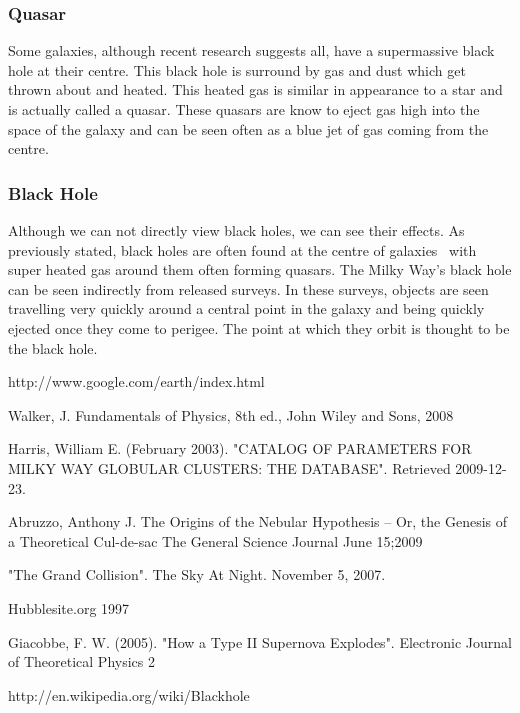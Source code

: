 \documentclass{article}
\begin{document}
\subsubsection{Quasar}
Some galaxies, although recent research suggests all, have a supermassive black hole at their 
centre. This black hole is surround by gas and dust which get thrown about and heated. This
heated gas is similar in appearance to a star and is actually called a quasar. These quasars
are know to eject gas high into the space of the galaxy and can be seen often as a blue jet
of gas coming from the centre.

\subsubsection{Black Hole}
Although we can not directly view black holes, we can see their effects. As previously stated,
black holes are often found at the centre of galaxies~\cite{Wik:2013} with super heated gas around them often
forming quasars. The Milky Way's black hole can be seen indirectly from released surveys. In
these surveys, objects are seen travelling very quickly around a central point in the galaxy and
being quickly ejected once they come to perigee. The point at which they orbit is thought
to be the black hole.


\begin{thebibliography}{9}

http://www.google.com/earth/index.html

Walker, J. Fundamentals of Physics, 8th ed., John Wiley and Sons, 2008

Harris, William E. (February 2003). "CATALOG OF PARAMETERS FOR MILKY WAY GLOBULAR CLUSTERS: THE DATABASE". Retrieved 2009-12-23.

Abruzzo, Anthony J. The Origins of the Nebular Hypothesis – Or, the Genesis of a Theoretical Cul-de-sac The General Science Journal June 15;2009

"The Grand Collision". The Sky At Night. November 5, 2007.

Hubblesite.org 1997

Giacobbe, F. W. (2005). "How a Type II Supernova Explodes". Electronic Journal of Theoretical Physics 2

http://en.wikipedia.org/wiki/Blackhole

\end{thebibliography}
\end{document}
